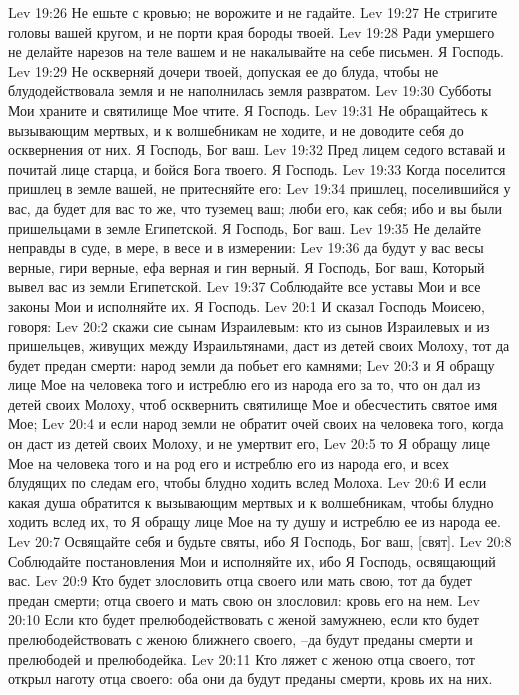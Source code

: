 Lev 19:26  Не ешьте с кровью; не ворожите и не гадайте.
Lev 19:27  Не стригите головы вашей кругом, и не порти края бороды твоей.
Lev 19:28  Ради умершего не делайте нарезов на теле вашем и не накалывайте на себе письмен. Я Господь.
Lev 19:29  Не оскверняй дочери твоей, допуская ее до блуда, чтобы не блудодействовала земля и не наполнилась земля развратом.
Lev 19:30  Субботы Мои храните и святилище Мое чтите. Я Господь.
Lev 19:31  Не обращайтесь к вызывающим мертвых, и к волшебникам не ходите, и не доводите себя до осквернения от них. Я Господь, Бог ваш.
Lev 19:32  Пред лицем седого вставай и почитай лице старца, и бойся Бога твоего. Я Господь.
Lev 19:33  Когда поселится пришлец в земле вашей, не притесняйте его:
Lev 19:34  пришлец, поселившийся у вас, да будет для вас то же, что туземец ваш; люби его, как себя; ибо и вы были пришельцами в земле Египетской. Я Господь, Бог ваш.
Lev 19:35  Не делайте неправды в суде, в мере, в весе и в измерении:
Lev 19:36  да будут у вас весы верные, гири верные, ефа верная и гин верный. Я Господь, Бог ваш, Который вывел вас из земли Египетской.
Lev 19:37  Соблюдайте все уставы Мои и все законы Мои и исполняйте их. Я Господь.
Lev 20:1  И сказал Господь Моисею, говоря:
Lev 20:2  скажи сие сынам Израилевым: кто из сынов Израилевых и из пришельцев, живущих между Израильтянами, даст из детей своих Молоху, тот да будет предан смерти: народ земли да побьет его камнями;
Lev 20:3  и Я обращу лице Мое на человека того и истреблю его из народа его за то, что он дал из детей своих Молоху, чтоб осквернить святилище Мое и обесчестить святое имя Мое;
Lev 20:4  и если народ земли не обратит очей своих на человека того, когда он даст из детей своих Молоху, и не умертвит его,
Lev 20:5  то Я обращу лице Мое на человека того и на род его и истреблю его из народа его, и всех блудящих по следам его, чтобы блудно ходить вслед Молоха.
Lev 20:6  И если какая душа обратится к вызывающим мертвых и к волшебникам, чтобы блудно ходить вслед их, то Я обращу лице Мое на ту душу и истреблю ее из народа ее.
Lev 20:7  Освящайте себя и будьте святы, ибо Я Господь, Бог ваш, [свят].
Lev 20:8  Соблюдайте постановления Мои и исполняйте их, ибо Я Господь, освящающий вас.
Lev 20:9  Кто будет злословить отца своего или мать свою, тот да будет предан смерти; отца своего и мать свою он злословил: кровь его на нем.
Lev 20:10  Если кто будет прелюбодействовать с женой замужнею, если кто будет прелюбодействовать с женою ближнего своего, --да будут преданы смерти и прелюбодей и прелюбодейка.
Lev 20:11  Кто ляжет с женою отца своего, тот открыл наготу отца своего: оба они да будут преданы смерти, кровь их на них.
